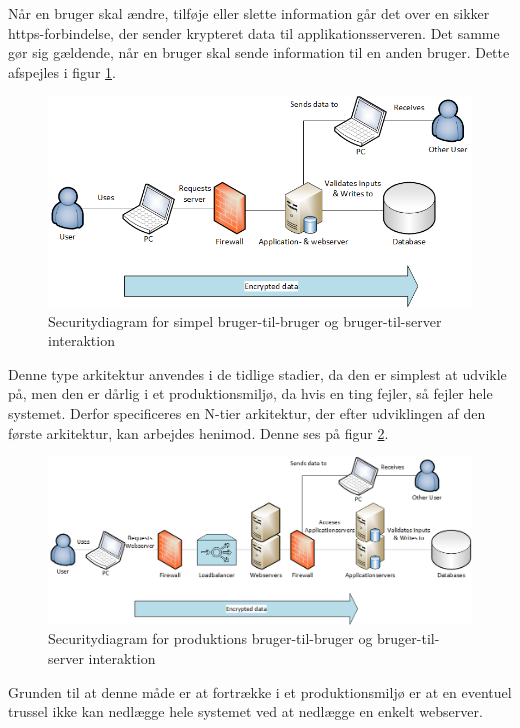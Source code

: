 \documentclass[Rapport/Rapport_main.tex]{subfiles}
\begin{document}
Når en bruger skal ændre, tilføje eller slette information går det over en sikker https-forbindelse, der sender krypteret data til applikationsserveren. Det samme gør sig gældende, når en bruger skal sende information til en anden bruger. Dette afspejles i figur \ref{fig:security_diagram_first}.
\begin{figure}[H]
    \centering
    \includegraphics[width=\textwidth]{Arkitektur/graphics/SecurityDiagramFirst.png}
    \caption{Securitydiagram for simpel bruger-til-bruger og bruger-til-server interaktion}
    \label{fig:security_diagram_first}
\end{figure}
Denne type arkitektur anvendes i de tidlige stadier, da den er simplest at udvikle på, men den er dårlig i et produktionsmiljø, da hvis en ting fejler, så fejler hele systemet. Derfor specificeres en N-tier arkitektur\cite{Security}, der efter udviklingen af den første arkitektur, kan arbejdes henimod. Denne ses på figur \ref{fig:security_diagram}.

\begin{figure}[H]
    \centering
    \includegraphics[width=\textwidth]{Arkitektur/graphics/SecurityDiagram.png}
    \caption{Securitydiagram for produktions bruger-til-bruger og bruger-til-server interaktion}
    \label{fig:security_diagram}
\end{figure}

Grunden til at denne måde er at fortrække i et produktionsmiljø er at en eventuel trussel ikke kan nedlægge hele systemet ved at nedlægge en enkelt webserver.
\end{document}

